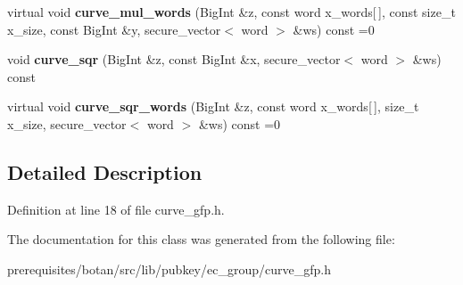 \begin{DoxyCompactItemize}
\item 
\mbox{\label{class_botan_1_1_curve_g_fp___repr_afca2ab1bf99e1279391f947b9e1c498c}} 
virtual void {\bfseries curve\+\_\+mul\+\_\+words} (Big\+Int \&z, const word x\+\_\+words\mbox{[}$\,$\mbox{]}, const size\+\_\+t x\+\_\+size, const Big\+Int \&y, secure\+\_\+vector$<$ word $>$ \&ws) const =0
\item 
\mbox{\label{class_botan_1_1_curve_g_fp___repr_a9b652bfeb9dda232ef0f8836964a319c}} 
void {\bfseries curve\+\_\+sqr} (Big\+Int \&z, const Big\+Int \&x, secure\+\_\+vector$<$ word $>$ \&ws) const
\item 
\mbox{\label{class_botan_1_1_curve_g_fp___repr_a78d34766a7ffbf3593591f3c15827d45}} 
virtual void {\bfseries curve\+\_\+sqr\+\_\+words} (Big\+Int \&z, const word x\+\_\+words\mbox{[}$\,$\mbox{]}, size\+\_\+t x\+\_\+size, secure\+\_\+vector$<$ word $>$ \&ws) const =0
\end{DoxyCompactItemize}


\subsection{Detailed Description}


Definition at line 18 of file curve\+\_\+gfp.\+h.



The documentation for this class was generated from the following file\+:\begin{DoxyCompactItemize}
\item 
prerequisites/botan/src/lib/pubkey/ec\+\_\+group/curve\+\_\+gfp.\+h\end{DoxyCompactItemize}
